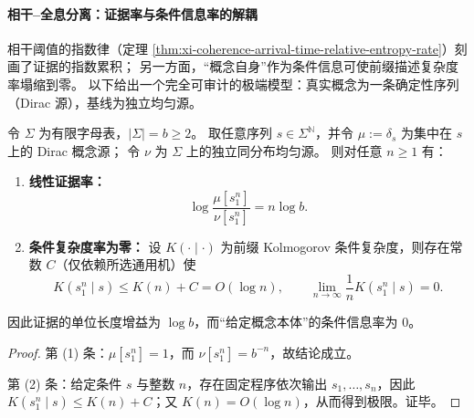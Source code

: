 \paragraph{相干--全息分离：证据率与条件信息率的解耦}
相干阈值的指数律（定理 \ref{thm:xi-coherence-arrival-time-relative-entropy-rate}）刻画了证据的指数累积；
另一方面，“概念自身”作为条件信息可使前缀描述复杂度率塌缩到零。
以下给出一个完全可审计的极端模型：真实概念为一条确定性序列（Dirac 源），基线为独立均匀源。

\begin{proposition}\label{prop:xi-holography-coherence-separation}
令 \(\Sigma\) 为有限字母表，\(|\Sigma|=b\ge 2\)。
取任意序列 \(s\in\Sigma^{\mathbb N}\)，并令 \(\mu:=\delta_s\) 为集中在 \(s\) 上的 Dirac 概念源；
令 \(\nu\) 为 \(\Sigma\) 上的独立同分布均匀源。
则对任意 \(n\ge 1\) 有：
\begin{enumerate}
  \item \textbf{线性证据率：}
  \[
  \log\frac{\mu[s_1^n]}{\nu[s_1^n]}=n\log b.
  \]
  \item \textbf{条件复杂度率为零：}
  设 \(K(\cdot\mid\cdot)\) 为前缀 Kolmogorov 条件复杂度，则存在常数 \(C\)（仅依赖所选通用机）使
  \[
  K(s_1^n\mid s)\le K(n)+C=O(\log n),
  \qquad
  \lim_{n\to\infty}\frac1nK(s_1^n\mid s)=0.
  \]
\end{enumerate}
因此证据的单位长度增益为 \(\log b\)，而“给定概念本体”的条件信息率为 \(0\)。
\end{proposition}
\begin{proof}
第 (1) 条：\(\mu[s_1^n]=1\)，而 \(\nu[s_1^n]=b^{-n}\)，故结论成立。
\par
第 (2) 条：给定条件 \(s\) 与整数 \(n\)，存在固定程序依次输出 \(s_1,\dots,s_n\)，因此 \(K(s_1^n\mid s)\le K(n)+C\)；又 \(K(n)=O(\log n)\)，从而得到极限。证毕。
\end{proof}
